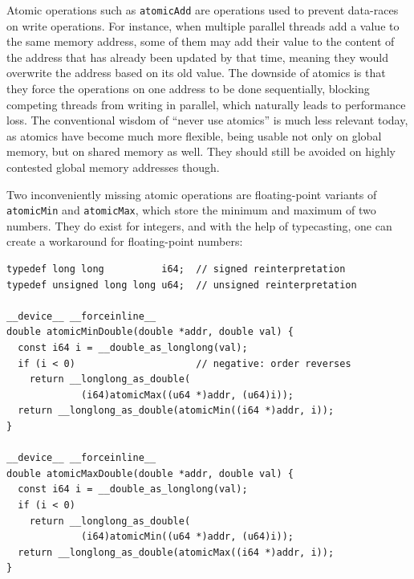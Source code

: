 Atomic operations such as \texttt{atomicAdd} are operations used to prevent data-races on write operations.
For instance, when multiple parallel threads add a value to the same memory address, some of them may add their value to the content of the address that has already been updated by that time, meaning they would overwrite the address based on its old value.
The downside of atomics is that they force the operations on one address to be done sequentially, blocking competing threads from writing in parallel, which naturally leads to performance loss.
The conventional wisdom of ``never use atomics'' is much less relevant today, as atomics have become much more flexible, being usable not only on global memory, but on shared memory as well.
They should still be avoided on highly contested global memory addresses though.

Two inconveniently missing atomic operations are floating-point variants of \texttt{atomicMin} and \texttt{atomicMax}, which store the minimum and maximum of two numbers.
They do exist for integers, and with the help of typecasting, one can create a workaround for floating-point numbers:

\begin{lstlisting}[style=cudastyle,caption={FP64 minimum and maximum atomics assembled from the native 64-bit integer atomics.},label={lst:atomic-min-max-double}]
typedef long long          i64;  // signed reinterpretation
typedef unsigned long long u64;  // unsigned reinterpretation

__device__ __forceinline__
double atomicMinDouble(double *addr, double val) {
  const i64 i = __double_as_longlong(val);
  if (i < 0)                     // negative: order reverses
    return __longlong_as_double(
             (i64)atomicMax((u64 *)addr, (u64)i));
  return __longlong_as_double(atomicMin((i64 *)addr, i));
}

__device__ __forceinline__
double atomicMaxDouble(double *addr, double val) {
  const i64 i = __double_as_longlong(val);
  if (i < 0)
    return __longlong_as_double(
             (i64)atomicMin((u64 *)addr, (u64)i));
  return __longlong_as_double(atomicMax((i64 *)addr, i));
}
\end{lstlisting}

